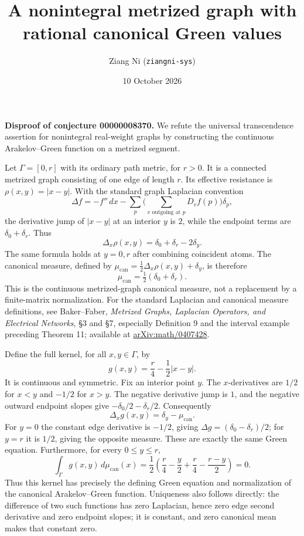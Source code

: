 \documentclass[11pt]{article}
\title{A nonintegral metrized graph with rational canonical Green values}
\author{Ziang Ni (\texttt{ziangni-sys})}
\date{10 October 2026}
\begin{document}
\maketitle
\noindent\textbf{Disproof of conjecture 00000008370.}
We refute the universal transcendence assertion for nonintegral
real-weight graphs by constructing the continuous Arakelov--Green
function on a metrized segment.

Let $\Gamma=[0,r]$ with its ordinary path metric, for $r>0$. It is a
connected metrized graph consisting of one edge of length $r$. Its
effective resistance is $\rho(x,y)=|x-y|$. With the standard graph
Laplacian convention
\[
 \Delta f=-f''\,dx-\sum_p\Big(\sum_{v\text{ outgoing at }p}D_vf(p)\Big)\delta_p,
\]
the derivative jump of $|x-y|$ at an interior $y$ is $2$, while the
endpoint terms are $\delta_0+\delta_r$. Thus
\[
 \Delta_x\rho(x,y)=\delta_0+\delta_r-2\delta_y.
\]
The same formula holds at $y=0,r$ after combining coincident atoms.
The canonical measure, defined by
$\mu_{\mathrm{can}}=\tfrac12\Delta_x\rho(x,y)+\delta_y$, is therefore
\[
 \mu_{\mathrm{can}}=\tfrac12(\delta_0+\delta_r).
\]
This is the continuous metrized-graph canonical measure, not a
replacement by a finite-matrix normalization. For the standard
Laplacian and canonical measure definitions, see Baker--Faber,
\emph{Metrized Graphs, Laplacian Operators, and Electrical Networks},
\S3 and \S7, especially Definition 9 and the interval example preceding
Theorem 11; available at
\href{https://arxiv.org/abs/math/0407428}{arXiv:math/0407428}.

Define the full kernel, for all $x,y\in\Gamma$, by
\[
 g(x,y)=\frac r4-\frac12|x-y|.
\]
It is continuous and symmetric. Fix an interior point $y$.
The $x$-derivatives are $1/2$ for $x<y$ and $-1/2$ for $x>y$.
The negative derivative jump is $1$, and the negative outward endpoint
slopes give $-\delta_0/2-\delta_r/2$. Consequently
\[
 \Delta_xg(x,y)=\delta_y-\mu_{\mathrm{can}}.
\]
For $y=0$ the constant edge derivative is $-1/2$, giving
$\Delta g=(\delta_0-\delta_r)/2$; for $y=r$ it is $1/2$, giving
the opposite measure. These are exactly the same Green equation.
Furthermore, for every $0\leq y\leq r$,
\[
 \int_\Gamma g(x,y)\,d\mu_{\mathrm{can}}(x)
 =\frac12\left(\frac r4-\frac y2+\frac r4-\frac{r-y}{2}\right)=0.
\]
Thus this kernel has precisely the defining Green equation and
normalization of the canonical Arakelov--Green function. Uniqueness
also follows directly: the difference of two such functions has zero
Laplacian, hence zero edge second derivative and zero endpoint slopes;
it is constant, and zero canonical mean makes that constant zero.
\end{document}
